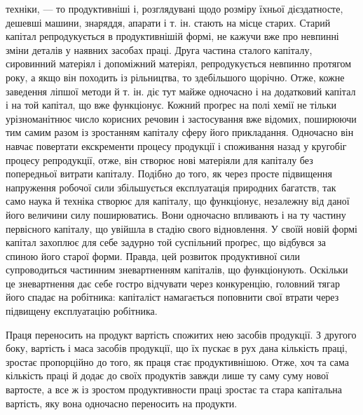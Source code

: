 \parcont{}  %
техніки, — то продуктивніші і, розглядувані щодо розміру
їхньої дієздатносте, дешевші машини, знаряддя, апарати і т. ін.
стають на місце старих. Старий капітал репродукується в продуктивнішій
формі, не кажучи вже про невпинні зміни деталів
у наявних засобах праці. Друга частина сталого капіталу, сировинний
матеріял і допоміжний матеріял, репродукується невпинно
протягом року, а якщо він походить із рільництва, то здебільшого
щорічно. Отже, кожне заведення ліпшої методи й т. ін.
діє тут майже одночасно і на додатковий капітал і на той капітал,
що вже функціонує. Кожний проґрес на полі хемії не тільки урізноманітнює
число корисних речовин і застосування вже відомих,
поширюючи тим самим разом із зростанням капіталу сферу його
прикладання. Одночасно він навчає повертати екскременти процесу
продукції і споживання назад у кругобіг процесу репродукції,
отже, він створює нові матеріяли для капіталу без попередньої
витрати капіталу. Подібно до того, як через просте підвищення
напруження робочої сили збільшується експлуатація
природних багатств, так само наука й техніка створює для капіталу,
що функціонує, незалежну від даної його величини силу
поширюватись. Вони одночасно впливають і на ту частину первісного
капіталу, що увійшла в стадію свого відновлення. У своїй
новій формі капітал захоплює для себе задурно той суспільний
проґрес, що відбувся за спиною його старої форми. Правда, цей
розвиток продуктивної сили супроводиться частинним зневартненням
капіталів, що функціонують. Оскільки це зневартнення
дає себе гостро відчувати через конкуренцію, головний тягар
його спадає на робітника: капіталіст намагається поповнити свої
втрати через підвищену експлуатацію робітника.

Праця переносить на продукт вартість спожитих нею засобів
продукції. З другого боку, вартість і маса засобів продукції,
що їх пускає в рух дана кількість праці, зростає пропорційно
до того, як праця стає продуктивнішою. Отже, хоч та сама кількість
праці й додає до своїх продуктів завжди лише ту саму суму
нової вартосте, а все ж із зростом продуктивности праці зростає
та стара капітальна вартість, яку вона одночасно переносить
на продукти.

